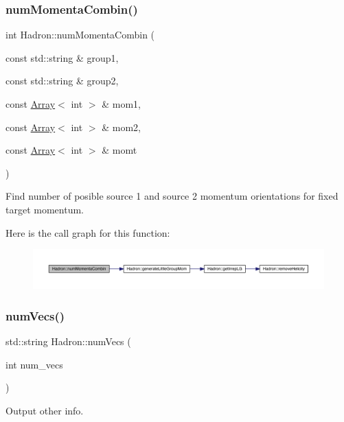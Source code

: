 \subsubsection{\texorpdfstring{numMomentaCombin()}{numMomentaCombin()}}
{\footnotesize\ttfamily int Hadron\+::num\+Momenta\+Combin (\begin{DoxyParamCaption}\item[{const std\+::string \&}]{group1,  }\item[{const std\+::string \&}]{group2,  }\item[{const \mbox{\hyperlink{classXMLArray_1_1Array}{Array}}$<$ int $>$ \&}]{mom1,  }\item[{const \mbox{\hyperlink{classXMLArray_1_1Array}{Array}}$<$ int $>$ \&}]{mom2,  }\item[{const \mbox{\hyperlink{classXMLArray_1_1Array}{Array}}$<$ int $>$ \&}]{momt }\end{DoxyParamCaption})}



Find number of posible source 1 and source 2 momentum orientations for fixed target momentum. 

Here is the call graph for this function\+:\nopagebreak
\begin{figure}[H]
\begin{center}
\leavevmode
\includegraphics[width=350pt]{d1/daf/namespaceHadron_afc213211f9c79372b449aac381596d1c_cgraph}
\end{center}
\end{figure}
\mbox{\label{namespaceHadron_afea9ddb2112da9cb61d87881799fff49}} 
\subsubsection{\texorpdfstring{numVecs()}{numVecs()}}
{\footnotesize\ttfamily std\+::string Hadron\+::num\+Vecs (\begin{DoxyParamCaption}\item[{int}]{num\+\_\+vecs }\end{DoxyParamCaption})}



Output other info. 

